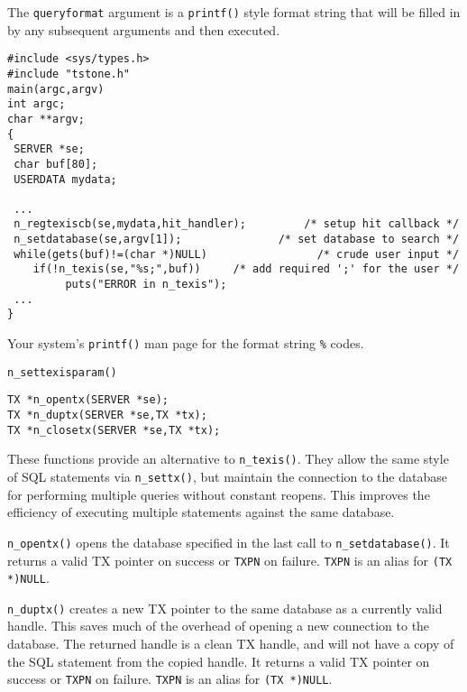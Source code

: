 The \verb`queryformat` argument is a \verb`printf()` style format string
that will be filled in by any subsequent arguments and then executed.

\EXAMPLE
\begin{verbatim}
#include <sys/types.h>
#include "tstone.h"
main(argc,argv)
int argc;
char **argv;
{
 SERVER *se;
 char buf[80];
 USERDATA mydata;

 ...
 n_regtexiscb(se,mydata,hit_handler);         /* setup hit callback */
 n_setdatabase(se,argv[1]);               /* set database to search */
 while(gets(buf)!=(char *)NULL)                 /* crude user input */
    if(!n_texis(se,"%s;",buf))     /* add required ';' for the user */
         puts("ERROR in n_texis");
 ...
}
\end{verbatim}

\SEE
Your system's \verb`printf()` man page for the format string \verb`%` codes.
\begin{verbatim}
n_settexisparam()
\end{verbatim}


\SYNOPSIS
\begin{verbatim}
TX *n_opentx(SERVER *se);
TX *n_duptx(SERVER *se,TX *tx);
TX *n_closetx(SERVER *se,TX *tx);
\end{verbatim}

\DESCRIPTION

These functions provide an alternative to \verb`n_texis()`.  They allow
the same style of SQL statements via \verb`n_settx()`, but maintain the
connection to the database for performing multiple queries without
constant reopens.  This improves the efficiency of executing multiple
statements against the same database.

\verb`n_opentx()` opens the database specified in the last call to
\verb`n_setdatabase()`. It returns a valid TX pointer on success or
\verb`TXPN` on failure. \verb`TXPN` is an alias for \verb`(TX *)NULL`.

\verb`n_duptx()` creates a new TX pointer to the same database as a
currently valid handle.  This saves much of the overhead of opening
a new connection to the database.  The returned handle is a clean
TX handle, and will not have a copy of the SQL statement from the
copied handle.
It returns a valid TX pointer on success or
\verb`TXPN` on failure. \verb`TXPN` is an alias for \verb`(TX *)NULL`.


